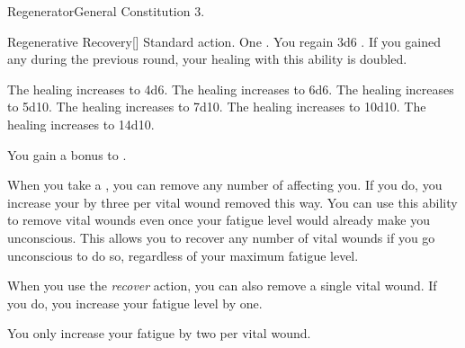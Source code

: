     \begin{feat}{Regenerator}{General}
        \featpre Constitution 3.

        \begin{activeability}{Regenerative Recovery}[]
            \abilityusagetime Standard action.
            \abilitycost One .
            \rankline
            You regain 3d6 .
            If you gained any  during the previous round, your healing with this ability is doubled.

            \rankline
             The healing increases to 4d6.
             The healing increases to 6d6.
             The healing increases to 5d10.
             The healing increases to 7d10.
             The healing increases to 10d10.
             The healing increases to 14d10.
        \end{activeability}

         You gain a  bonus to .

         When you take a , you can remove any number of  affecting you.
        If you do, you increase your  by three per vital wound removed this way.
        You can use this ability to remove vital wounds even once your fatigue level would already make you unconscious.
        This allows you to recover any number of vital wounds if you go unconscious to do so, regardless of your maximum fatigue level.

         When you use the \textit{recover} action, you can also remove a single vital wound.
        If you do, you increase your fatigue level by one.

         You only increase your fatigue by two per vital wound.
    \end{feat}

